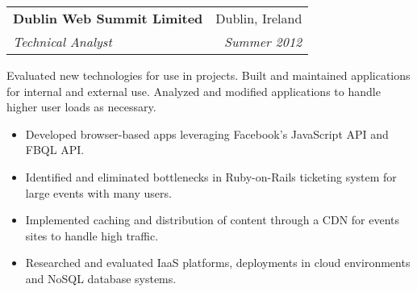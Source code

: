 \documentclass[11pt]{article}
\makeatletter
\newenvironment{resumeSubSectionHeader}{
    \par
    \begin{tabular*}{\textwidth}{l@{\extracolsep{\fill}}r}
    \par
} {
    \end{tabular*}
    \par
}
\newenvironment{resumeSubSectionBody}{
    \par
    \vspace{-0.4\parskip}
    \begin{small}
    \par
} {
    \par
    \end{small}
    \par
}
\newenvironment{resumeItemize}{
    \vspace{-0.5\baselineskip}
    \begin{itemize}
} {
    \end{itemize}
}
\makeatother
\begin{document}
\begin{resumeSubSectionBody}
\end{resumeSubSectionBody}

%
%
\begin{resumeSubSectionHeader}

    \textbf{Dublin Web Summit Limited} & Dublin, Ireland   \\
    \emph{Technical Analyst}           & \emph{Summer 2012}

\end{resumeSubSectionHeader}
\begin{resumeSubSectionBody}

    Evaluated new technologies for use in projects.
    Built and maintained applications for internal and external use.
    Analyzed and modified applications to handle higher user loads
    as necessary.

    \begin{resumeItemize}
        \item
            Developed browser-based apps leveraging Facebook's JavaScript API
            and FBQL API.

        \item
            Identified and eliminated bottlenecks in Ruby-on-Rails
            ticketing system for large events with many users.

        \item
            Implemented caching and distribution of content through a CDN
            for events sites to handle high traffic.

        \item
            Researched and evaluated IaaS platforms, deployments in cloud
            environments and NoSQL database systems.
    \end{resumeItemize}

\end{resumeSubSectionBody}
\end{document}
